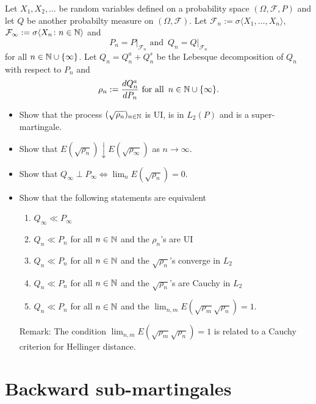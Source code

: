 \begin{exercise}
Let $X_1, X_2, \ldots$ be random variables defined on a probability space $(\Omega, \mathcal F, P)$ and let $Q$ be another probabilty measure on $(\Omega, \mathcal F)$. Let $\mathcal F_n:=\sigma\langle X_1,\ldots, X_n\rangle$,  $\mathcal F_\infty :=\sigma\langle  X_n\colon n\in \Bbb N\rangle $ and
\[ P_n = P\bigr|_{\mathcal F_n}\text{ and }\,  Q_n = Q\bigr|_{\mathcal F_n}\]
for all $n\in \Bbb N\cup\{\infty\}$. Let $Q_n = Q_n^a + Q_n^s$ be the Lebesque decomposition of $Q_n$ with respect to $P_n$ and
\[
\rho_n := \frac{dQ^a_n}{dP_n} \text{ for all $\,n\in \Bbb N\cup\{\infty\}$.}
\]
\begin{itemize}
\item  Show that the process $(\sqrt{\rho_n})_{n\in \Bbb N}$ is UI, is in $L_2(P)$ and is a super-martingale.
\item
Show that $E(\sqrt{\rho_n})\downarrow E(\sqrt{\rho_\infty})$ as $n\rightarrow \infty$.
\item
Show that $Q_\infty\perp P_\infty\Longleftrightarrow \lim_n E(\sqrt{\rho_n}) = 0$.
\item
Show that the following statements are equivalent
\begin{enumerate}
\item $Q_\infty\ll P_\infty$
\item $Q_n\ll P_n$ for all $n\in \Bbb N$ and the $\rho_n$'s are UI
\item $Q_n\ll P_n$ for all $n\in \Bbb N$ and the $\sqrt{\rho_n}$'s converge in $L_2$
\item $Q_n\ll P_n$ for all $n\in \Bbb N$ and the $\sqrt{\rho_n}$'s are Cauchy in $L_2$
\item $Q_n\ll P_n$ for all $n\in \Bbb N$ and the $\lim_{n,m}E(\sqrt{\rho_m}\sqrt{\rho_n})=1$.
\end{enumerate}
Remark: The condition $\lim_{n,m}E(\sqrt{\rho_m}\sqrt{\rho_n})=1$ is related to a Cauchy criterion for Hellinger distance.
\end{itemize}
\end{exercise}





%
%
\section{Backward sub-martingales}


